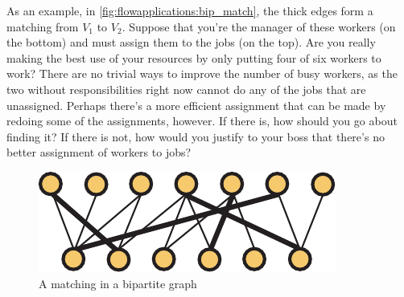 As an example, in \autoref{fig:flowapplications:bip_match}, the thick
edges form a matching from $V_1$ to $V_2$. Suppose that you're the
manager of these workers (on the bottom) and must assign them to the
jobs (on the top). Are you really making the best use of your
resources by only putting four of six workers to work? There are no
trivial ways to improve the number of busy workers, as the two without
responsibilities right now cannot do any of the jobs that are
unassigned. Perhaps there's a more efficient assignment that can be
made by redoing some of the assignments, however. If there is, how
should you go about finding it? If there is not, how would you justify
to your boss that there's no better assignment of workers to jobs?
\begin{figure}[h]
  \centering
  \includegraphics[scale=0.65]{flowapplications-figs/bipartite_graph_part_match}
  \caption{A matching in a bipartite graph}
  \label{fig:flowapplications:bip_match}
\end{figure}


